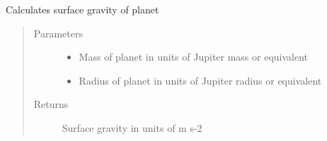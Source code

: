 \documentclass[a4paper,11pt,english]{sphinxmanual}
\begin{document}
\begin{fulllineitems}
\label{\detokenize{cascade.exoplanet_tools:cascade.exoplanet_tools.exoplanet_tools.SurfaceGravity}}
Calculates surface gravity of planet
\begin{quote}\begin{description}
\item[{Parameters}] \leavevmode\begin{itemize}
\item {} 
 \textendash{} Mass of planet in units of Jupiter mass or equivalent

\item {} 
 \textendash{} Radius of planet in units of Jupiter radius or equivalent

\end{itemize}

\item[{Returns}] \leavevmode
{} \textendash{} Surface gravity in units of  m s-2

\end{description}\end{quote}

\end{fulllineitems}

\end{document}
